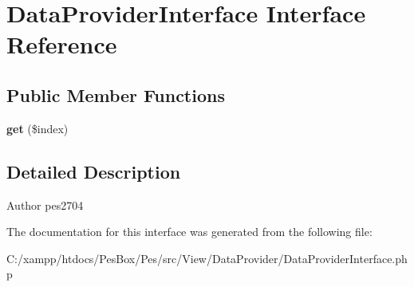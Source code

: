 \hypertarget{interface_data_provider_interface}{}\section{Data\+Provider\+Interface Interface Reference}
\label{interface_data_provider_interface}
\subsection*{Public Member Functions}
\begin{DoxyCompactItemize}
\item 
\mbox{\label{interface_data_provider_interface_a83366960f81b1627f37353da9768c264}} 
{\bfseries get} (\$index)
\end{DoxyCompactItemize}


\subsection{Detailed Description}
\begin{DoxyAuthor}{Author}
pes2704 
\end{DoxyAuthor}


The documentation for this interface was generated from the following file\+:\begin{DoxyCompactItemize}
\item 
C\+:/xampp/htdocs/\+Pes\+Box/\+Pes/src/\+View/\+Data\+Provider/Data\+Provider\+Interface.\+php\end{DoxyCompactItemize}
